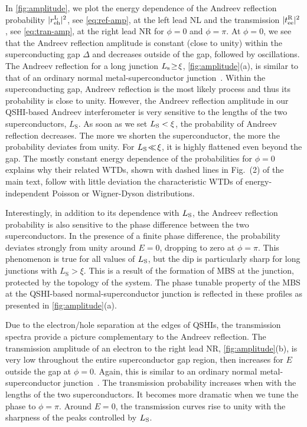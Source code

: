 \documentclass[aps,prl,amsmath,twocolumn,floatfix,superscriptaddress,longbibliography,footinbib]{revtex4-1}
\begin{document}
In \cref{fig:amplitude}, we plot the energy dependence of the Andreev reflection probability $|r^{\rm L}_{\rm eh}|^2$, see \cref{eq:ref-amp}, at the left lead NL and the transmission $|t^{\rm R}_{\rm ee}|^2$, see \cref{eq:tran-amp}, at the right lead NR for $\phi\!=\!0$ and $\phi\!=\!\pi$. 
At $\phi\!=\!0$, we see that the Andreev reflection amplitude is constant (close to unity) within the superconducting gap $\Delta$ and decreases outside of the gap, followed by oscillations. The Andreev reflection for a long junction $L_{\rm s}\!\ge\!\xi$, \cref{fig:amplitude}(a), is similar to that of an ordinary normal metal-superconductor junction~\cite{Blonder1982}. Within the superconducting gap, Andreev reflection is the most likely process and thus its probability is close to unity. However, the Andreev reflection amplitude in our QSHI-based Andreev interferometer is very sensitive to the lengths of the two superconductors, $L_\text{S}$. As soon as we set $L_{\rm S}<\xi$, the probability of Andreev reflection decreases. The more we shorten the superconductor, the more the probability deviates from unity. For $L_{\rm S}\!\ll\!\xi$, it is highly flattened even beyond the gap. The mostly constant energy dependence of the probabilities for $\phi=0$ explains why their related WTDs, shown with dashed lines in Fig.~(2) of the main text, follow with little deviation the characteristic WTDs of energy-independent Poisson or Wigner-Dyson distributions. 

Interestingly, in addition to its dependence with $L_{\rm S}$, the Andreev reflection probability is also sensitive to the phase difference between the two superconductors. In the presence of a finite phase difference, the probability deviates strongly from unity around $E\!=\!0$, dropping to zero at $\phi\!=\!\pi$. This phenomenon is true for all values of $L_{\rm S}$, but the dip is particularly sharp for long junctions with $L_\text{S}>\xi$. This is a result of the formation of MBS at the junction, protected by the topology of the system. The phase tunable property of the MBS at the QSHI-based normal-superconductor junction is reflected in these profiles as presented in \cref{fig:amplitude}(a). 

Due to the electron/hole separation at the edges of QSHIs, the transmission spectra provide a picture complementary to the Andreev reflection. The transmission amplitude of an electron to the right lead NR, \cref{fig:amplitude}(b), is very low throughout the entire superconductor gap region, then increases for $E$ outside the gap at $\phi\!=\!0$. Again, this is similar to an ordinary normal metal-superconductor junction~\cite{Blonder1982}. The transmission probability increases when with the lengths of the two superconductors. It becomes more dramatic when we tune the phase to $\phi=\pi$. Around $E\!=\!0$, the transmission curves rise to unity with the sharpness of the peaks controlled by $L_{\rm S}$. 
\end{document}

